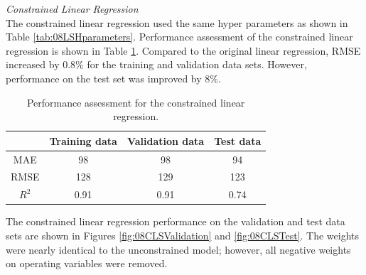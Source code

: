 \noindent
\textit{Constrained Linear Regression} \\
\indent
The constrained linear regression used the same hyper parameters as shown in Table \ref{tab:08LSHparameters}.  Performance assessment of the constrained linear regression is shown in Table \ref{tab:08ConstLSPerformance}. Compared to the original linear regression, RMSE increased by 0.8\% for the training and validation data sets.  However, performance on the test set was improved by 8\%.  
\begin{table}[h]
    \centering
    {
    \begin{tabular}{ c | c | c | c}
                             &  Training data    &  Validation data   &    Test data      \\
        \hline
        MAE                  &  98               &    98              &  94     \\
        RMSE                 &  128              &   129              &  123    \\ 
        $R^2$                &  0.91             &   0.91             &  0.74   \\
    \end{tabular}}
    \caption{Performance assessment for the constrained linear regression.}
    \label{tab:08ConstLSPerformance}
\end{table}
The constrained linear regression performance on the validation and test data sets are shown in Figures \ref{fig:08CLSValidation} and \ref{fig:08CLSTest}. The weights were nearly identical to the unconstrained model; however, all negative weights on operating variables were removed.
